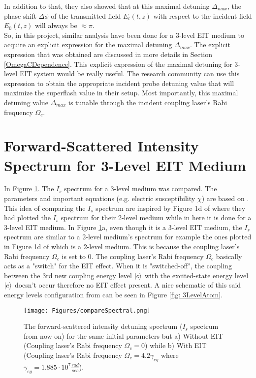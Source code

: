 In addition to that, they also showed that at this maximal detuning $\Delta_{max}$, the phase shift $\Delta\phi$ of the transmitted field $E_{t}(t, z)$ with respect to the incident field $E_{0}(t, z)$ will always be $\approx \pi$.\\

So, in this project, similar analysis have been done for a 3-level EIT medium to acquire an explicit expression for the maximal detuning $\Delta_{max}$. The explicit expression that was obtained are discussed in more details in Section \ref{OmegaCDependence}. This explicit expression of the maximal detuning for 3-level EIT system would be really useful. The research community can use this expression to obtain the appropriate incident probe detuning value that will maximize the superflash value in their setup. Most importantly, this maximal detuning value $\Delta_{max}$ is tunable through the incident coupling laser's Rabi frequency $\Omega_{c}$.


\section{Forward-Scattered Intensity Spectrum for 3-Level EIT Medium}
In Figure \ref{fig: comparing Is spectrum}. The $I_{s}$ spectrum for a 3-level medium was compared. The parameters and important equations (e.g. electric susceptibility $\chi$) are based on \cite{jeong2010slow}. This idea of comparing the $I_{s}$ spectrum are inspired by Figure 1d of \cite{Kwong2014} where they had plotted the $I_{s}$ spectrum for their 2-level medium while in here it is done for a 3-level EIT medium. In Figure \ref{fig: comparing Is spectrum}a, even though it is a 3-level EIT medium, the $I_{s}$ spectrum are similar to a 2-level medium's spectrum for example the ones plotted in Figure 1d of \cite{Kwong2014} which is a 2-level medium. This is because the coupling laser's Rabi frequency $\Omega_{c}$ is set to $0$. The coupling laser's Rabi frequency $\Omega_{c}$ basically acts as a "switch" for the EIT effect. When it is "switched-off", the coupling between the 3rd new coupling energy level $\ket{c}$ with the excited-state energy level $\ket{e}$ doesn't occur therefore no EIT effect present. A nice schematic of this said energy levels configuration from \cite{Jeong2009} can be seen in Figure \ref{fig: 3LevelAtom}.

\begin{figure}[h!]
    \centering
    \texttt{[image: Figures/compareSpectral.png]}
    \caption{The forward-scattered intensity detuning spectrum ($I_{s}$ spectrum from now on) for the same initial parameters but a) Without EIT (Coupling laser's Rabi frequency $\Omega_{c} = 0$) while b) With EIT (Coupling laser's Rabi frequency $\Omega_{c} = 4.2\gamma_{eg}$ where $\gamma_{eg} = 1.885 \cdot 10^{7} \frac{rad}{sec}$).}
    \label{fig: comparing Is spectrum}
\end{figure}

